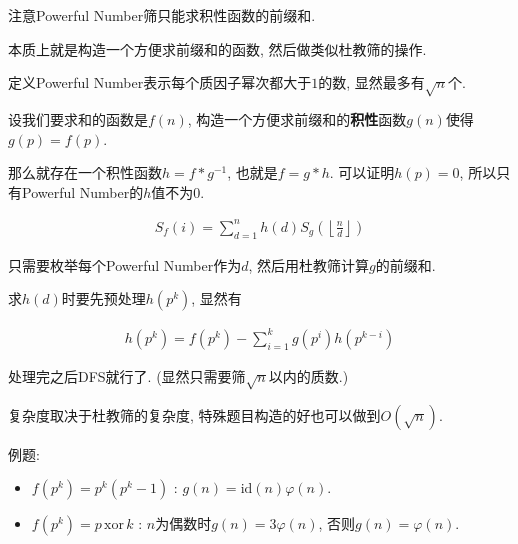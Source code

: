 注意Powerful Number筛只能求积性函数的前缀和.

本质上就是构造一个方便求前缀和的函数, 然后做类似杜教筛的操作.

定义Powerful Number表示每个质因子幂次都大于$1$的数, 显然最多有$\sqrt n$个.

设我们要求和的函数是$f(n)$, 构造一个方便求前缀和的\textbf{积性}函数$g(n)$使得$g(p) = f(p)$.

那么就存在一个积性函数$h = f * g ^ {-1}$, 也就是$f = g *h$. 可以证明$h(p) = 0$, 所以只有Powerful Number的$h$值不为0.

$$ \begin{aligned}
	S_f(i) = \sum_{d = 1} ^ n h(d) S_g \left( \left\lfloor \frac n d \right\rfloor \right)
\end{aligned} $$

只需要枚举每个Powerful Number作为$d$, 然后用杜教筛计算$g$的前缀和.

求$h(d)$时要先预处理$h(p^k)$, 显然有

$$ \begin{aligned}
	h \left(p ^ k \right) = f \left(p ^ k \right) - \sum_{i = 1} ^ k g \left( p ^ i \right) h \left( p ^ {k - i} \right)
\end{aligned} $$

处理完之后DFS就行了. (显然只需要筛$\sqrt n$以内的质数.)

复杂度取决于杜教筛的复杂度, 特殊题目构造的好也可以做到$O \left( \sqrt n \right)$.

例题:

\begin{itemize}
	\item $f \left( p ^ k \right) = p ^ k \left( p ^ k - 1 \right)$ : $g(n) = \text{id}(n) \varphi(n)$.
	\item $f \left( p ^ k \right) = p \, \text{xor} \, k$ : $n$为偶数时$g(n) = 3 \varphi(n)$, 否则$g(n) = \varphi(n)$.
\end{itemize}